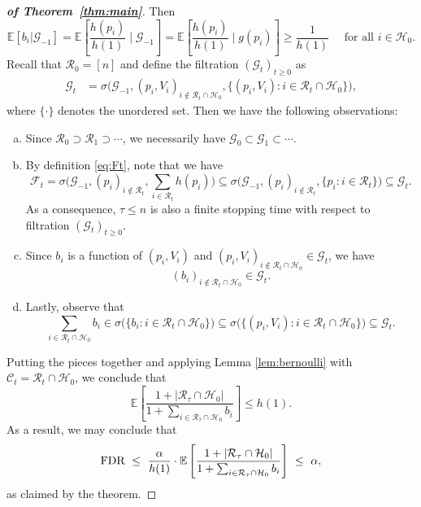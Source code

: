 \documentclass{biometrika}
\newcommand{\cH}{\mathcal{H}}
\newcommand{\cF}{\mathcal{F}}
\newcommand{\cG}{\mathcal{G}}
\newcommand{\cC}{\mathcal{C}}
\newcommand{\cR}{\mathcal{R}}
\newcommand{\FDR}{\textnormal{FDR}}
\newcommand{\E}{\mathbb{E}}
\newcommand{\1}{\mathbf{1}}
\begin{document}
\begin{proof}[\textbf{of Theorem~\ref{thm:main}}]
Then 
\begin{equation}\label{eq:bi_cond}
\E [b_{i} | \cG_{-1}] = \E \left[\frac{h(p_{i})}{h(1)}\mid \cG_{-1}\right] = \E \left[\frac{h(p_{i})}{h(1)}\mid g(p_{i})\right]\ge \frac{1}{h(1)} \quad \text{ for all } i \in \cH_{0}.
\end{equation}
Recall that $\cR_{0} = [n]$ and define the filtration $(\cG_{t})_{t\ge 0}$ as
\begin{align*}
\cG_{t} &= \sigma\bigg( \cG_{-1}, (p_{i}, V_{i})_{i\notin \cR_{t}\cap \cH_{0}}, \{(p_{i}, V_{i}) : {i\in \cR_{t}\cap \cH_{0}}\}\bigg),
\end{align*}
where $\{\cdot\}$ denotes the unordered set. Then we have the following observations:
\begin{enumerate}[(a)]
\item Since $\cR_{0}\supset \cR_{1}\supset\cdots$, we necessarily have $\cG_{0}\subset \cG_{1}\subset\cdots$.
    
\item By definition \eqref{eq:Ft}, note that we have
\[\cF_{t} = \sigma\bigg(\cG_{-1}, (p_{i})_{i\notin \cR_{t}}, \sum_{i\in\cR_{t}}h(p_{i})\bigg)\subseteq \sigma\bigg(\cG_{-1}, (p_{i})_{i\notin \cR_{t}}, \{p_{i}: i\in \cR_{t}\}\bigg) \subseteq \cG_t.\]
As a consequence, $\tau \leq n$ is also a finite stopping time with respect to filtration $(\cG_{t})_{t\ge 0}$. 
\item Since $b_{i}$ is a function of $(p_{i}, V_{i})$ and $(p_{i}, V_{i})_{i\not\in \cR_{t}\cap \cH_{0}} \in \cG_{t}$, we have
\begin{equation}\label{eq:accept_bi}
(b_{i})_{i\not\in \cR_{t}\cap \cH_{0}}\in \cG_{t}.
\end{equation}
\item Lastly, observe that
\[
\sum_{i\in \cR_{t}\cap \cH_{0}}b_{i} \in \sigma\bigg(\{b_{i}: i\in \cR_{t}\cap \cH_{0}\}\bigg)\subseteq \sigma\bigg(\{(p_{i}, V_{i}): i\in \cR_{t}\cap \cH_{0}\}\bigg) \subseteq \cG_t.
\]
\end{enumerate}
Putting the pieces together  and applying Lemma \ref{lem:bernoulli} with $\cC_{t} = \cR_{t}\cap \cH_{0}$, we conclude that
\begin{equation}\label{eq:FDR}
\E\left[ \frac{1 + |\cR_{\tau}\cap \cH_{0}|}{1 + \sum_{i\in \cR_{\tau}\cap\cH_{0}}b_{i}}\right]\le h(1).
\end{equation}
As a result, we may conclude that 
\[\FDR ~\le~ \frac{\alpha}{h(1)} \cdot \E\left[ \frac{1 + |\cR_{\tau}\cap \cH_{0}|}{1 + \sum_{i\in \cR_{\tau}\cap\cH_{0}}b_{i}}\right] ~\le~ \alpha,\]
as claimed by the theorem.
\end{proof}
\end{document}
